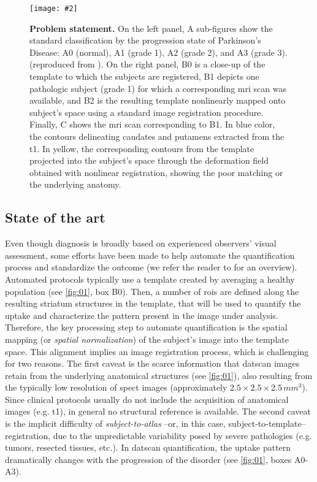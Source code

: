 \documentclass{frontiers}
\newcommand{\insertgraphic}[2]{\texttt{[image: \#2]}}
\newcommand{\insertgraphic}[2]{\texttt{[image: \#2]}}
\newcommand{\gridsize}[1]{\ensuremath{#1\times#1\times#1}}
\newcommand{\isores}[2]{\ensuremath{\gridsize{#1}\,#2^{3}}}
\begin{document}
  
\begin{figure*}[ht]
\insertgraphic{width=1.0\linewidth}{figures/01-ProblemStatement}
\caption{\label{fig:01} \textbf{Problem statement.} 
On the left panel, A sub-figures show the standard classification by 
  the progression state of Parkinson's Disease: 
  A0 (normal), A1 (grade 1), A2 (grade 2), and A3 (grade 3). 
  (reproduced from \cite{center_for_drug_evaluation_and_research_fda_2011}).
On the right panel, B0 is a close-up of the template to which the subjects are registered, B1 depicts 
  one pathologic subject (grade 1) for which a corresponding \gls*{mri} scan was available, 
  and B2 is the resulting template nonlinearly mapped onto subject's space using a standard 
  image registration procedure.
Finally, C shows the \gls*{mri} scan corresponding to B1.
In blue color, the contours delineating caudates and putamens extracted from the \acrlong*{t1}.
In yellow, the corresponding contours from the template projected into the subject's space through 
  the deformation field obtained with nonlinear registration, showing the poor matching
  or the underlying anatomy.
}
\end{figure*}

\subsection{State of the art}\label{sec:state-of-art}
Even though diagnosis is broadly based on experienced observers' visual
  assessment, some efforts have been made to help automate the quantification
  process and standardize the outcome (we refer the reader to
  \citep{badiavas_spect_2011} for an overview).
Automated protocols typically use a template created by averaging a healthy
  population (see \autoref{fig:01}, box B0).
Then, a number of \glspl*{roi} are defined along the resulting striatum 
  structures in the template, that will be used to quantify the uptake and characterize the
  pattern present in the image under analysis.
Therefore, the key processing step to automate quantification is the
  spatial mapping (or \emph{spatial normalization}) of the subject's image into 
  the template space.
This alignment implies an image registration process, which is challenging for two reasons.
The first caveat  is the scarce information that \gls*{datscan} images 
  retain from the underlying anatomical structures (see \autoref{fig:01}),
  also resulting from the typically low resolution of
  \gls*{spect} images (approximately \isores{2.5}{mm}).
Since clinical protocols usually do not include the acquisition of anatomical images
  (e.g. \gls*{t1}), in general no structural reference is available.
The second caveat is the implicit difficulty of \emph{subject-to-atlas} 
  --or, in this case, subject-to-template-- registration, due to the unpredictable 
  variability posed by severe pathologies (e.g. tumors, resected tissues, etc.).
In \gls*{datscan} quantification, the uptake pattern dramatically changes 
  with the progression of the disorder (see \autoref{fig:01}, boxes A0-A3).
\end{document}

